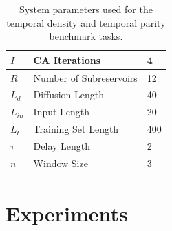 \documentclass{elsarticle}
\begin{document}
\begin{multicols}{2}
	
	\begin{table}[H] \centering
		\begin{tabular}{|l|l|l|}
			\hline
			\textbf{$I$}      & CA Iterations           & 4   \\ \hline
			\textbf{$R$}      & Number of Subreservoirs & 12  \\ \hline
			\textbf{$L_{d}$}  & Diffusion Length        & 40  \\ \hline 
			\textbf{$L_{in}$} & Input Length            & 20  \\ \hline
			\textbf{$L_{t}$}  & Training Set Length     & 400 \\ \hline
			\textbf{$\tau$}   & Delay Length            & 2   \\ \hline
			\textbf{$n$}      & Window Size             & 3   \\ \hline
		\end{tabular}
		\caption{System parameters used for the temporal density and temporal parity 
		benchmark tasks.}
		\label{table:temp_settings}
	\end{table}
	
	
	
	\section{Experiments}\label{experiment}

\end{multicols}
\end{document}
